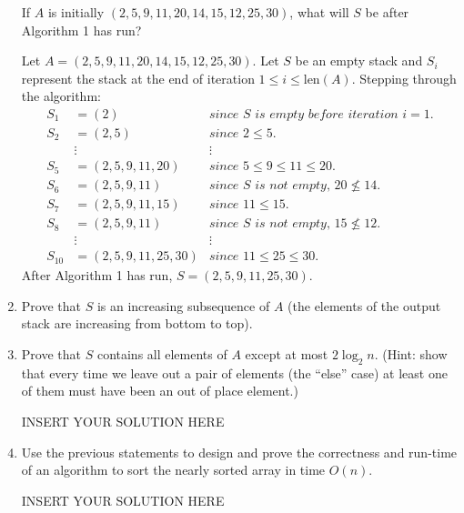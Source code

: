 \begin{enumerate}
    If $A$ is initially $(2,5,9,11,20,14,15,12,25,30)$, what will $S$ be after Algorithm 1 has run?
\begin{solution}
Let $A=(2,5,9,11,20,14,15,12,25,30)$. Let $S$ be an empty stack and $S_i$ represent the stack at the end of iteration $1\leq i\leq\text{len}(A)$. Stepping through the algorithm:
\begin{align*}
S_1&=(2)&\textit{since $S$ is empty before iteration $i=1$.}\\
S_2&=(2,5)&\textit{since $2\leq 5$.}\\
~&\vdots&\vdots\\
S_5&=(2,5,9,11,20)&\textit{since $5\leq 9\leq 11\leq 20$.}\\
S_6&=(2,5,9,11)&\textit{since $S$ is not empty, $20\nleq 14$.}\\
S_7&=(2,5,9,11,15)&\textit{since $11\leq 15$.}\\
S_8&=(2,5,9,11)&\textit{since $S$ is not empty, $15\nleq 12$.}\\
~&\vdots&\vdots\\
S_{10}&=(2,5,9,11,25,30)&\textit{since $11\leq 25\leq 30$.}
\end{align*}
After Algorithm 1 has run, $S=(2,5,9,11,25,30)$.
\end{solution}
    \item Prove that $S$ is an increasing subsequence of $A$ (the elements of the output stack are increasing from bottom to top).
\begin{solution}

\end{solution}
    
    
    \item Prove that $S$ contains all elements of $A$ except at most $2\log_2 n$. (Hint: show that every time we leave out a pair of elements (the ``else'' case) at least one of them must have been an out of place element.)

\begin{solution}   INSERT YOUR SOLUTION HERE   \end{solution}

    
    \item Use the previous statements to design and prove the correctness and run-time of an algorithm to sort the nearly sorted array in time $O(n)$. 
    

\begin{solution}   INSERT YOUR SOLUTION HERE   \end{solution}
\end{enumerate}






